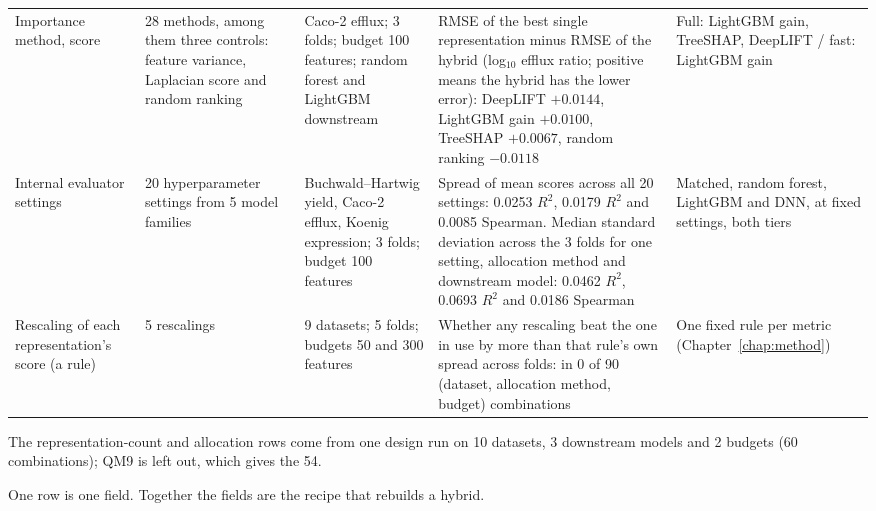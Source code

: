 {\begin{longtable}{@{}p{1.9cm}p{2.5cm}p{2.7cm}p{4.4cm}p{2.5cm}@{}}
\addlinespace
Importance method, score & 28 methods, among them three controls: feature variance, Laplacian score and random ranking & Caco-2 efflux; 3 folds; budget 100 features; random forest and LightGBM downstream & RMSE of the best single representation minus RMSE of the hybrid (log$_{10}$ efflux ratio; positive means the hybrid has the lower error): DeepLIFT $+0.0144$, LightGBM gain $+0.0100$, TreeSHAP $+0.0067$, random ranking $-0.0118$ & Full: LightGBM gain, TreeSHAP, DeepLIFT / fast: LightGBM gain \\
\addlinespace
Internal evaluator settings & 20 hyperparameter settings from 5 model families & Buchwald--Hartwig yield, Caco-2 efflux, Koenig expression; 3 folds; budget 100 features & Spread of mean scores across all 20 settings: 0.0253 $R^2$, 0.0179 $R^2$ and 0.0085 Spearman. Median standard deviation across the 3 folds for one setting, allocation method and downstream model: 0.0462 $R^2$, 0.0693 $R^2$ and 0.0186 Spearman & Matched, random forest, LightGBM and DNN, at fixed settings, both tiers \\
\addlinespace
Rescaling of each representation's score (a rule) & 5 rescalings & 9 datasets; 5 folds; budgets 50 and 300 features & Whether any rescaling beat the one in use by more than that rule's own spread across folds: in 0 of 90 (dataset, allocation method, budget) combinations & One fixed rule per metric (Chapter~\ref{chap:method}) \\
\bottomrule
\end{longtable}
{\footnotesize The representation-count and allocation rows come from one design run on 10 datasets, 3 downstream models and 2 budgets (60 combinations); QM9 is left out, which gives the 54.}
}

\label{app:add:blueprint_fields}
One row is one field. Together the fields are the recipe that rebuilds a hybrid.

